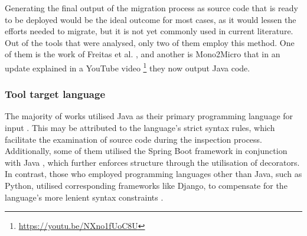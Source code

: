 Generating the final output of the migration process as source code that is
ready to be deployed would be the ideal outcome for most cases, as it would
lessen the efforts needed to migrate, but it is not yet commonly used in
current literature. Out of the tools that were analysed, only two of them
employ this method. One of them is the work of Freitas et al.
, and another is Mono2Micro
 that in an update explained in a YouTube video
\footnote{\url{https://youtu.be/NXno1fUoC8U}} they now output Java code.

\subsubsection{Tool target language}

The majority of works utilised Java as their primary programming language for
input . This may be
attributed to the language's strict syntax rules, which facilitate the
examination of source code during the inspection process. Additionally, some of
them utilised the Spring Boot framework in conjunction with Java
, which
further enforces structure through the utilisation of decorators. In contrast,
those who employed programming languages other than Java, such as Python,
utilised corresponding frameworks like Django, to compensate for the language's
more lenient syntax constraints .

